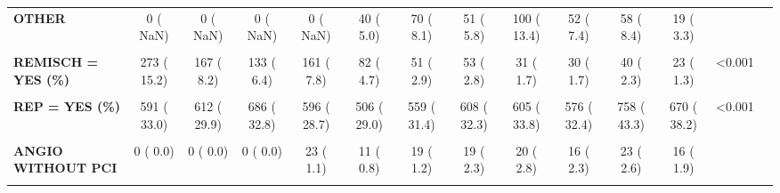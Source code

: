 \documentclass[
]{article}
\begin{document}
\begin{table}[H]
\begin{tabular}[t]{>{\raggedright\arraybackslash}p{5em}ccccccccccccc}
\textbf{OTHER} & 0 (  NaN) & 0 (  NaN) & 0 (  NaN) & 0 (  NaN) & 40 (  5.0) & 70 (  8.1) & 51 (  5.8) & 100 ( 13.4) & 52 (  7.4) & 58 (  8.4) & 19 (  3.3) &  & \\
\textbf{\cellcolor{gray!10}{PATIENT'S DECISION}} & \cellcolor{gray!10}{0 (  NaN)} & \cellcolor{gray!10}{0 (  NaN)} & \cellcolor{gray!10}{0 (  NaN)} & \cellcolor{gray!10}{0 (  NaN)} & \cellcolor{gray!10}{701 ( 87.8)} & \cellcolor{gray!10}{768 ( 88.9)} & \cellcolor{gray!10}{743 ( 84.7)} & \cellcolor{gray!10}{574 ( 76.8)} & \cellcolor{gray!10}{629 ( 89.1)} & \cellcolor{gray!10}{591 ( 86.0)} & \cellcolor{gray!10}{515 ( 89.4)} & \cellcolor{gray!10}{} & \cellcolor{gray!10}{}\\
\textbf{REMISCH = YES (\%)} & 273 ( 15.2) & 167 (  8.2) & 133 (  6.4) & 161 (  7.8) & 82 (  4.7) & 51 (  2.9) & 53 (  2.8) & 31 (  1.7) & 30 (  1.7) & 40 (  2.3) & 23 (  1.3) & <0.001 & \\
\textbf{\cellcolor{gray!10}{REMI\_30D = YES (\%)}} & \cellcolor{gray!10}{0 (  NaN)} & \cellcolor{gray!10}{70 (  3.4)} & \cellcolor{gray!10}{37 (  1.8)} & \cellcolor{gray!10}{51 (  2.5)} & \cellcolor{gray!10}{47 (  2.7)} & \cellcolor{gray!10}{31 (  1.7)} & \cellcolor{gray!10}{20 (  1.1)} & \cellcolor{gray!10}{15 (  0.8)} & \cellcolor{gray!10}{15 (  1.0)} & \cellcolor{gray!10}{22 (  1.5)} & \cellcolor{gray!10}{16 (  1.4)} & \cellcolor{gray!10}{NaN} & \cellcolor{gray!10}{}\\
\textbf{REP = YES (\%)} & 591 ( 33.0) & 612 ( 29.9) & 686 ( 32.8) & 596 ( 28.7) & 506 ( 29.0) & 559 ( 31.4) & 608 ( 32.3) & 605 ( 33.8) & 576 ( 32.4) & 758 ( 43.3) & 670 ( 38.2) & <0.001 & \\
\textbf{\cellcolor{gray!10}{REPT (\%)}} & \cellcolor{gray!10}{} & \cellcolor{gray!10}{} & \cellcolor{gray!10}{} & \cellcolor{gray!10}{} & \cellcolor{gray!10}{} & \cellcolor{gray!10}{} & \cellcolor{gray!10}{} & \cellcolor{gray!10}{} & \cellcolor{gray!10}{} & \cellcolor{gray!10}{} & \cellcolor{gray!10}{} & \cellcolor{gray!10}{<0.001} & \cellcolor{gray!10}{}\\
\textbf{ANGIO WITHOUT PCI} & 0 (  0.0) & 0 (  0.0) & 0 (  0.0) & 23 (  1.1) & 11 (  0.8) & 19 (  1.2) & 19 (  2.3) & 20 (  2.8) & 16 (  2.3) & 23 (  2.6) & 16 (  1.9) &  & \\
\textbf{\cellcolor{gray!10}{NO PRIM.REP.}} & \cellcolor{gray!10}{1202 ( 67.0)} & \cellcolor{gray!10}{1436 ( 70.1)} & \cellcolor{gray!10}{1403 ( 67.2)} & \cellcolor{gray!10}{1479 ( 71.3)} & \cellcolor{gray!10}{959 ( 65.5)} & \cellcolor{gray!10}{1083 ( 66.0)} & \cellcolor{gray!10}{212 ( 25.8)} & \cellcolor{gray!10}{112 ( 15.6)} & \cellcolor{gray!10}{109 ( 15.9)} & \cellcolor{gray!10}{137 ( 15.6)} & \cellcolor{gray!10}{179 ( 21.8)} & \cellcolor{gray!10}{} & \cellcolor{gray!10}{}\\

\end{tabular}
\end{table}
\end{document}
